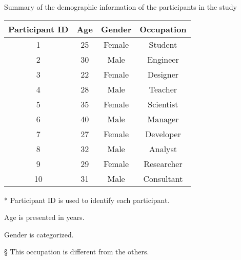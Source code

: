 \begin{center}
    \begin{threeparttable}[htbp]
        \caption{Summary of the demographic information of the participants in the study}
        \label{tab:participants}
        \begin{tabular}{cccc}
            \toprule
                \textbf{Participant ID\tnote{*}} & \textbf{Age\tnote{\textdagger}} & \textbf{Gender\tnote{\textdaggerdbl}} & \textbf{Occupation} \\
            \midrule
                1 & 25 & Female & Student \\
                2 & 30 & Male & Engineer \\
                3 & 22 & Female & Designer \\
                4 & 28 & Male & Teacher \\
                5 & 35 & Female & Scientist \\
                6 & 40 & Male & Manager \\
                7 & 27 & Female & Developer \\
                8 & 32 & Male & Analyst \\
                9 & 29 & Female & Researcher \\
                10 & 31 & Male & Consultant\tnote{\S} \\
            \bottomrule
        \end{tabular}
        \begin{tablenotes}
            \footnotesize
            \item[*] Participant ID is used to identify each participant.
            \item[\textdagger] Age is presented in years.
            \item[\textdaggerdbl] Gender is categorized.
            \item[\S] This occupation is different from the others.
        \end{tablenotes}
    \end{threeparttable}
\end{center}
